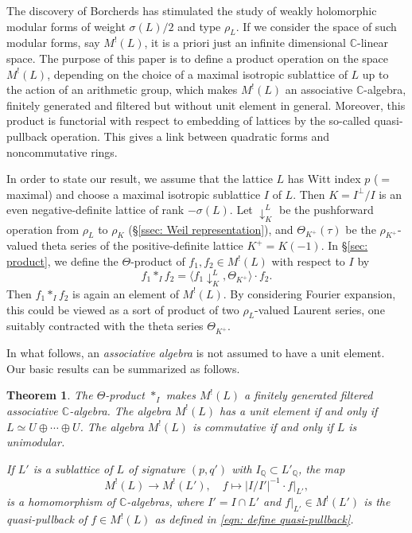 \documentclass[12pt]{amsart}
\numberwithin{equation}{section}
\newtheorem{theorem}{Theorem}[section]
\theoremstyle{definition}
\theoremstyle{remark}
\newcommand{\Q}{\mathbb{Q}}
\newcommand{\C}{\mathbb{C}}
\newcommand{\pushLK}{\downarrow^{L}_{K}}
\newcommand{\ThetaK}{\Theta_{K^{+}}}
\newcommand{\ML}{M^{!}(L)}
\begin{document}
The discovery of Borcherds has stimulated the study of 
weakly holomorphic modular forms of weight $\sigma(L)/2$ and type $\rho_{L}$.  
If we consider the space of such modular forms,  
say ${\ML}$, 
it is a priori just an infinite dimensional ${\C}$-linear space. 
The purpose of this paper is to define a product operation on the space ${\ML}$, 
depending on the choice of a maximal isotropic sublattice of $L$ up to the action of an arithmetic group, 
which makes ${\ML}$ an associative ${\C}$-algebra, finitely generated and filtered but without unit element in general. 
Moreover, this product is functorial with respect to embedding of lattices by the so-called quasi-pullback operation. 
This gives a link between quadratic forms and noncommutative rings. 

In order to state our result, 
we assume that the lattice $L$ has Witt index $p$ ($=$ maximal) and  
choose a maximal isotropic sublattice $I$ of $L$. 
Then $K=I^{\perp}/I$ is an even negative-definite lattice of rank $-\sigma(L)$. 
Let ${\pushLK}$ be the pushforward operation from $\rho_{L}$ to $\rho_{K}$ (\S \ref{ssec: Weil representation}), 
and ${\ThetaK}(\tau)$ be the $\rho_{K^{+}}$-valued theta series of the positive-definite lattice $K^{+}=K(-1)$. 
In \S \ref{sec: product}, we define the $\Theta$-product of $f_{1}, f_{2} \in {\ML}$ with respect to $I$ by 
\begin{equation*}
f_{1} \ast_{I} f_{2} = \langle f_{1}{\pushLK}, {\ThetaK} \rangle \cdot f_{2}.  
\end{equation*}
Then $f_{1} \ast_{I} f_{2}$ is again an element of ${\ML}$. 
By considering Fourier expansion, 
this could be viewed as a sort of product of two $\rho_{L}$-valued Laurent series, 
one suitably contracted with the theta series ${\ThetaK}$. 

In what follows, an \textit{associative algebra} is not assumed to have a unit element. 
Our basic results can be summarized as follows. 

\begin{theorem}\label{thm: main}
The $\Theta$-product $\ast_{I}$ makes ${\ML}$ a finitely generated filtered associative ${\C}$-algebra. 
The algebra ${\ML}$ has a unit element if and only if $L\simeq U\oplus \cdots \oplus U$. 
The algebra ${\ML}$ is commutative if and only if $L$ is unimodular. 

If $L'$ is a sublattice of $L$ of signature $(p, q')$ with $I_{{\Q}}\subset L'_{{\Q}}$, 
the map 
\begin{equation*}
{\ML} \to M^{!}(L'), \quad f\mapsto |I/I'|^{-1} \cdot f|_{L'}, 
\end{equation*}
is a homomorphism of ${\C}$-algebras, 
where $I'=I\cap L'$ and 
$f|_{L'}\in M^{!}(L')$ is the quasi-pullback of $f\in {\ML}$ 
as defined in \eqref{eqn: define quasi-pullback}. 
\end{theorem} 
\end{document}
